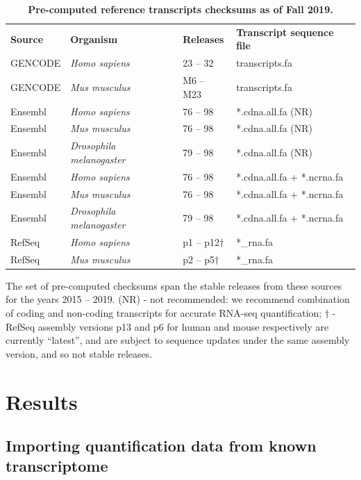 \begin{table}[t]
  \centering
  \caption{\bf{Pre-computed reference transcripts checksums as of Fall 2019.}}
\begin{tabular}{llll} 
  \hline
  \bf{Source} & \bf{Organism} & \bf{Releases} & \bf{Transcript sequence file} \\
  \thickhline
  GENCODE & \textit{Homo sapiens} & 23 -- 32 & transcripts.fa \\
  GENCODE & \textit{Mus musculus} & M6 -- M23 & transcripts.fa \\
  \hline
  Ensembl & \textit{Homo sapiens} & 76 -- 98 & *.cdna.all.fa (NR) \\
  Ensembl & \textit{Mus musculus} & 76 -- 98 & *.cdna.all.fa (NR) \\
  Ensembl & \textit{Drosophila melanogaster} & 79 -- 98 & *.cdna.all.fa (NR) \\
  \hline
  Ensembl & \textit{Homo sapiens} & 76 -- 98 & *.cdna.all.fa + *.ncrna.fa \\
  Ensembl & \textit{Mus musculus} & 76 -- 98 & *.cdna.all.fa + *.ncrna.fa \\
  Ensembl & \textit{Drosophila melanogaster} & 79 -- 98 & *.cdna.all.fa + *.ncrna.fa \\
  \hline
  RefSeq & \textit{Homo sapiens} & p1 -- p12$\dagger$ & *\_rna.fa \\
  RefSeq & \textit{Mus musculus} & p2 -- p5$\dagger$ & *\_rna.fa \\
\hline
\end{tabular}
\begin{flushleft}
  The set of pre-computed checksums span the stable releases from
  these sources for the years 2015 -- 2019. (NR) - not recommended: we
  recommend combination of coding and non-coding transcripts for
  accurate RNA-seq quantification; $\dagger$ - RefSeq assembly
  versions p13 and p6 for human and mouse respectively are currently
  ``latest'', and are subject to sequence updates under the same
  assembly version, and so not stable releases.
\end{flushleft}
\label{tab:hash}
\end{table}

\section*{Results}

\subsection*{Importing quantification data from known transcriptome}

